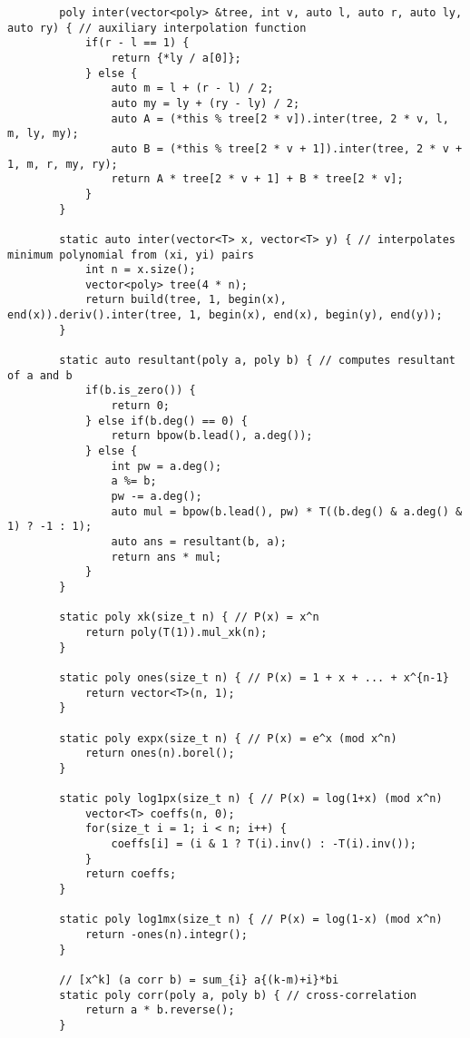 \begin{lstlisting}
        poly inter(vector<poly> &tree, int v, auto l, auto r, auto ly, auto ry) { // auxiliary interpolation function
            if(r - l == 1) {
                return {*ly / a[0]};
            } else {
                auto m = l + (r - l) / 2;
                auto my = ly + (ry - ly) / 2;
                auto A = (*this % tree[2 * v]).inter(tree, 2 * v, l, m, ly, my);
                auto B = (*this % tree[2 * v + 1]).inter(tree, 2 * v + 1, m, r, my, ry);
                return A * tree[2 * v + 1] + B * tree[2 * v];
            }
        }
        
        static auto inter(vector<T> x, vector<T> y) { // interpolates minimum polynomial from (xi, yi) pairs
            int n = x.size();
            vector<poly> tree(4 * n);
            return build(tree, 1, begin(x), end(x)).deriv().inter(tree, 1, begin(x), end(x), begin(y), end(y));
        }

        static auto resultant(poly a, poly b) { // computes resultant of a and b
            if(b.is_zero()) {
                return 0;
            } else if(b.deg() == 0) {
                return bpow(b.lead(), a.deg());
            } else {
                int pw = a.deg();
                a %= b;
                pw -= a.deg();
                auto mul = bpow(b.lead(), pw) * T((b.deg() & a.deg() & 1) ? -1 : 1);
                auto ans = resultant(b, a);
                return ans * mul;
            }
        }
                
        static poly xk(size_t n) { // P(x) = x^n
            return poly(T(1)).mul_xk(n);
        }
        
        static poly ones(size_t n) { // P(x) = 1 + x + ... + x^{n-1} 
            return vector<T>(n, 1);
        }
        
        static poly expx(size_t n) { // P(x) = e^x (mod x^n)
            return ones(n).borel();
        }

        static poly log1px(size_t n) { // P(x) = log(1+x) (mod x^n)
            vector<T> coeffs(n, 0);
            for(size_t i = 1; i < n; i++) {
                coeffs[i] = (i & 1 ? T(i).inv() : -T(i).inv());
            }
            return coeffs;
        }

        static poly log1mx(size_t n) { // P(x) = log(1-x) (mod x^n)
            return -ones(n).integr();
        }
        
        // [x^k] (a corr b) = sum_{i} a{(k-m)+i}*bi
        static poly corr(poly a, poly b) { // cross-correlation
            return a * b.reverse();
        }


\end{lstlisting}
